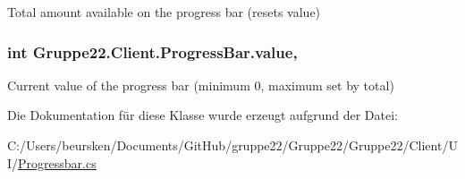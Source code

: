 Total amount available on the progress bar (resets value) 

\hypertarget{class_gruppe22_1_1_client_1_1_progress_bar_a01b5256bfaae8452ff2cbc7db92adc8a}{
\subsubsection[{value}]{\setlength{\rightskip}{0pt plus 5cm}int Gruppe22.\-Client.\-Progress\-Bar.\-value\hspace{0.3cm}{\ttfamily [get]}, {\ttfamily [set]}}}\label{class_gruppe22_1_1_client_1_1_progress_bar_a01b5256bfaae8452ff2cbc7db92adc8a}


Current value of the progress bar (minimum 0, maximum set by total) 



Die Dokumentation für diese Klasse wurde erzeugt aufgrund der Datei\-:\begin{DoxyCompactItemize}
\item 
C\-:/\-Users/beursken/\-Documents/\-Git\-Hub/gruppe22/\-Gruppe22/\-Gruppe22/\-Client/\-U\-I/\hyperlink{_progressbar_8cs}{Progressbar.\-cs}\end{DoxyCompactItemize}
